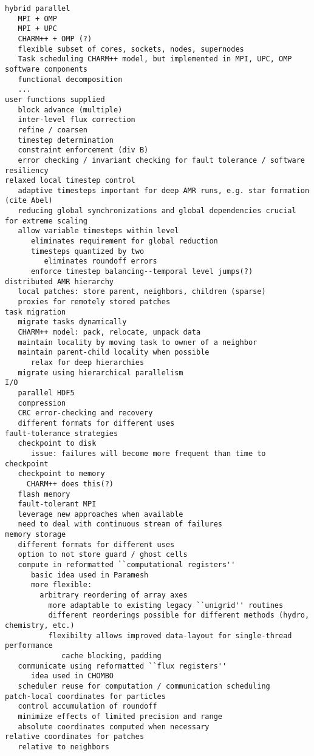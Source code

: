 \documentclass{article}
\begin{document}
\begin{verbatim}
hybrid parallel
   MPI + OMP
   MPI + UPC
   CHARM++ + OMP (?)
   flexible subset of cores, sockets, nodes, supernodes
   Task scheduling CHARM++ model, but implemented in MPI, UPC, OMP
software components
   functional decomposition
   ...
user functions supplied
   block advance (multiple)
   inter-level flux correction
   refine / coarsen
   timestep determination
   constraint enforcement (div B)
   error checking / invariant checking for fault tolerance / software resiliency
relaxed local timestep control
   adaptive timesteps important for deep AMR runs, e.g. star formation (cite Abel)
   reducing global synchronizations and global dependencies crucial for extreme scaling
   allow variable timesteps within level
      eliminates requirement for global reduction
      timesteps quantized by two
         eliminates roundoff errors
      enforce timestep balancing--temporal level jumps(?)
distributed AMR hierarchy
   local patches: store parent, neighbors, children (sparse)
   proxies for remotely stored patches
task migration
   migrate tasks dynamically
   CHARM++ model: pack, relocate, unpack data
   maintain locality by moving task to owner of a neighbor
   maintain parent-child locality when possible
      relax for deep hierarchies
   migrate using hierarchical parallelism
I/O
   parallel HDF5
   compression
   CRC error-checking and recovery
   different formats for different uses
fault-tolerance strategies
   checkpoint to disk
      issue: failures will become more frequent than time to checkpoint
   checkpoint to memory
     CHARM++ does this(?)
   flash memory
   fault-tolerant MPI
   leverage new approaches when available
   need to deal with continuous stream of failures
memory storage
   different formats for different uses
   option to not store guard / ghost cells
   compute in reformatted ``computational registers''
      basic idea used in Paramesh
      more flexible:
        arbitrary reordering of array axes
          more adaptable to existing legacy ``unigrid'' routines
          different reorderings possible for different methods (hydro, chemistry, etc.)
          flexibilty allows improved data-layout for single-thread performance
             cache blocking, padding
   communicate using reformatted ``flux registers''
      idea used in CHOMBO
   scheduler reuse for computation / communication scheduling
patch-local coordinates for particles
   control accumulation of roundoff
   minimize effects of limited precision and range
   absolute coordinates computed when necessary
relative coordinates for patches   
   relative to neighbors

\end{verbatim}
\end{document}
